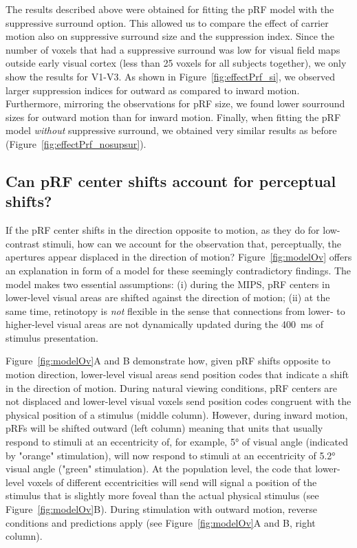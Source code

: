 The results described above were obtained for fitting the pRF model with the suppressive surround option. This allowed us to compare the effect of carrier motion also on suppressive surround size and the suppression index. Since the number of voxels that had a suppressive surround was low for visual field maps outside early visual cortex (less than 25 voxels for all subjects together), we only show the results for V1-V3. As shown in Figure~\ref{fig:effectPrf_si}, we observed larger suppression indices for outward as compared to inward motion. Furthermore, mirroring the observations for pRF size, we found lower sourround sizes for outward motion than for inward motion. Finally, when fitting the pRF model \textit{without} suppressive surround, we obtained very similar results as before (Figure~\ref{fig:effectPrf_nosupsur}).

\subsection{Can pRF center shifts account for perceptual shifts?}
If the pRF center shifts in the direction opposite to motion, as they do for low-contrast stimuli, how can we account for the observation that, perceptually, the apertures appear displaced in the direction of motion? Figure~\ref{fig:modelOv} offers an explanation in form of a model for these seemingly contradictory findings. The model makes two essential assumptions: (i) during the MIPS, pRF centers in lower-level visual areas are shifted against the direction of motion; (ii) at the same time, retinotopy is \textit{not} flexible in the sense that connections from lower- to higher-level visual areas are not dynamically updated during the 400~ms of stimulus presentation.

Figure~\ref{fig:modelOv}A and B demonstrate how, given pRF shifts opposite to motion direction, lower-level visual areas send position codes that indicate a shift in the direction of motion. During natural viewing conditions, pRF centers are not displaced and lower-level visual voxels send position codes congruent with the physical position of a stimulus (middle column). However, during inward motion, pRFs will be shifted outward (left column) meaning that units that usually respond to stimuli at an eccentricity of, for example, 5° of visual angle (indicated by "orange" stimulation), will now respond to stimuli at an eccentricity of 5.2° visual angle ("green" stimulation). At the population level, the code that lower-level voxels of different eccentricities will send will signal a position of the stimulus that is slightly more foveal than the actual physical stimulus (see Figure~\ref{fig:modelOv}B). During stimulation with outward motion, reverse conditions and predictions apply (see Figure~\ref{fig:modelOv}A and B, right column).

